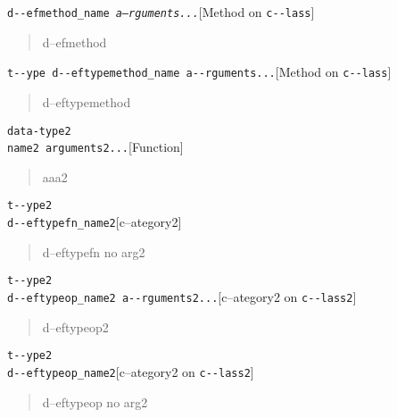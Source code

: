 \documentclass{book}
\begin{document}
\begin{titlepage}
\noindent\texttt{d{-}{-}efmethod\_name \EmbracOn{}\textnormal{\textsl{a--rguments...}}\EmbracOff{}}\hfill[Method on \texttt{c{-}{-}lass}]



%
\begin{quote}
d--efmethod
\end{quote}

\noindent\texttt{t{-}{-}ype d{-}{-}eftypemethod\_name a{-}{-}rguments...}\hfill[Method on \texttt{c{-}{-}lass}]



%
\begin{quote}
d--eftypemethod
\end{quote}


\noindent\texttt{data-type2\leavevmode{}\\name2 arguments2...}\hfill[Function]



%
\begin{quote}
aaa2
\end{quote}

\noindent\texttt{t{-}{-}ype2\leavevmode{}\\d{-}{-}eftypefn\_name2}\hfill[c--ategory2]



%
\begin{quote}
d--eftypefn no arg2
\end{quote}

\noindent\texttt{t{-}{-}ype2\leavevmode{}\\d{-}{-}eftypeop\_name2 a{-}{-}rguments2...}\hfill[c--ategory2 on \texttt{c{-}{-}lass2}]



%
\begin{quote}
d--eftypeop2
\end{quote}

\noindent\texttt{t{-}{-}ype2\leavevmode{}\\d{-}{-}eftypeop\_name2}\hfill[c--ategory2 on \texttt{c{-}{-}lass2}]



%
\begin{quote}
d--eftypeop no arg2
\end{quote}


\end{titlepage}
\end{document}
